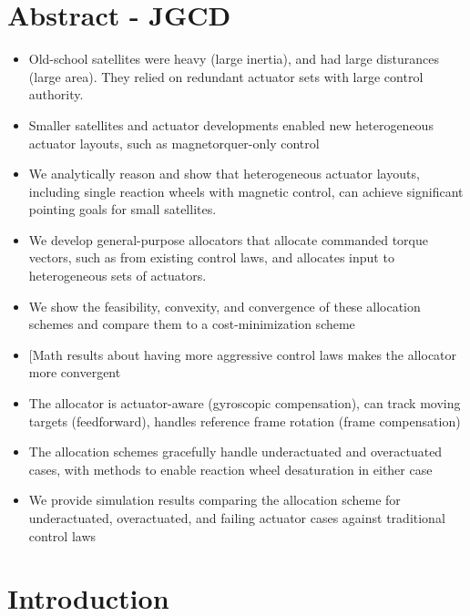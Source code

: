 \documentclass[conference]{IEEEtran}
\begin{document}
\newpage

\section{Abstract - JGCD}

\begin{itemize}
    \item Old-school satellites were heavy (large inertia), and had large disturances (large area). They relied on redundant actuator sets with large control authority.
    \item Smaller satellites and actuator developments enabled new heterogeneous actuator layouts, such as magnetorquer-only control
    \item We analytically reason and show that heterogeneous actuator layouts, including single reaction wheels with magnetic control, can achieve significant pointing goals for small satellites.
    \item We develop general-purpose allocators that allocate commanded torque vectors, such as from existing control laws, and allocates input to heterogeneous sets of actuators.
    \item We show the feasibility, convexity, and convergence of these allocation schemes and compare them to a cost-minimization scheme
    \item [Math results about having more aggressive control laws makes the allocator more convergent
    \item The allocator is actuator-aware (gyroscopic compensation), can track moving targets (feedforward), handles reference frame rotation (frame compensation)
    \item The allocation schemes gracefully handle underactuated and overactuated cases, with methods to enable reaction wheel desaturation in either case
    \item We provide simulation results comparing the allocation scheme for underactuated, overactuated, and failing actuator cases against traditional control laws
\end{itemize}

\newpage
\tableofcontents
\newpage

\section{Introduction}\label{sec:intro}
\end{document}
